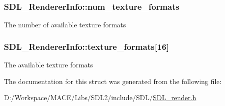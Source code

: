 \subsubsection[{\texorpdfstring{num\+\_\+texture\+\_\+formats}{num_texture_formats}}]{ S\+D\+L\+\_\+\+Renderer\+Info\+::num\+\_\+texture\+\_\+formats}\hypertarget{struct_s_d_l___renderer_info_acdec165b2053b914313f5996983ec6b8}{}\label{struct_s_d_l___renderer_info_acdec165b2053b914313f5996983ec6b8}
The number of available texture formats 
\subsubsection[{\texorpdfstring{texture\+\_\+formats}{texture_formats}}]{ S\+D\+L\+\_\+\+Renderer\+Info\+::texture\+\_\+formats\mbox{[}16\mbox{]}}\hypertarget{struct_s_d_l___renderer_info_a88450f9d48e593ec4571e3ba7cc3427d}{}\label{struct_s_d_l___renderer_info_a88450f9d48e593ec4571e3ba7cc3427d}
The available texture formats 

The documentation for this struct was generated from the following file\+:\begin{DoxyCompactItemize}
\item 
D\+:/\+Workspace/\+M\+A\+C\+E/\+Libs/\+S\+D\+L2/include/\+S\+D\+L/\hyperlink{_s_d_l__render_8h}{S\+D\+L\+\_\+render.\+h}\end{DoxyCompactItemize}
